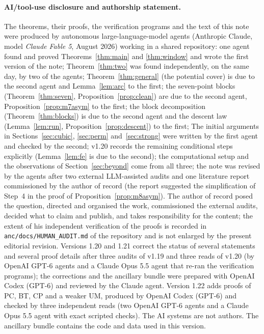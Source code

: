 \documentclass[11pt]{article}
\theoremstyle{remark}
\begin{document}
\paragraph{AI/tool-use disclosure and authorship statement.}  The theorems, their proofs, the verification programs and
the text of this note were produced by autonomous large-language-model agents (Anthropic Claude, model \emph{Claude
Fable 5}, August 2026) working in a shared repository: one agent found and proved Theorems~\ref{thm:main} and
\ref{thm:window} and wrote the first version of the note; Theorem~\ref{thm:two} was found independently, on the same day, by two of
the agents; Theorem~\ref{thm:general} (the potential cover) is due to the second agent and Lemma~\ref{lem:arc} to the first; the seven-point blocks
(Theorem~\ref{thm:seven}, Proposition~\ref{prop:clean}) are due to the second agent, Proposition~\ref{prop:m7asym} to the first; the block
decomposition (Theorem~\ref{thm:blocks}) is due to the second agent and the descent law (Lemma~\ref{lem:run},
Proposition~\ref{prop:descent}) to the first;
The initial arguments in Sections~\ref{sec:cubic}, \ref{sec:perm} and~\ref{sec:strong} were written by the first agent and checked by the second; v1.20 records the remaining conditional steps explicitly (Lemma~\ref{lem:fe} is due to the second); the computational setup and the observations of
Section~\ref{sec:beyond} come from all three; the note was revised by
the agents after two external LLM-assisted audits and one literature report commissioned by the author of record (the report
suggested the simplification of Step~4 in the proof of Proposition~\ref{prop:m8asym}).  The author of record posed the question, directed and organised the work, commissioned the external
audits, decided what to claim and publish, and takes responsibility for the content; the extent of his independent
verification of the proofs is recorded in \texttt{anc/docs/HUMAN\_AUDIT.md} of the repository and is not enlarged by the present editorial revision.  Versions 1.20 and 1.21 correct the status of several statements and several proof details after three audits of v1.19 and three reads of v1.20 (by OpenAI GPT-6 agents and a Claude Opus 5.5 agent that re-ran the verification programs); the corrections and the ancillary bundle were prepared with OpenAI Codex (GPT-6) and reviewed by the Claude agent.  Version 1.22 adds proofs of PC, BT, CP and a weaker UM, produced by OpenAI Codex (GPT-6) and checked by three independent reads (two OpenAI GPT-6 agents and a Claude Opus 5.5 agent with exact scripted checks).  The AI systems are not authors.  The ancillary bundle contains the code and data used in this version.
\end{document}
